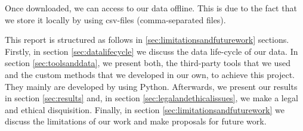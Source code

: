 Once downloaded, we can access to our data offline. This is due to the fact that we store it locally by using csv-files (comma-separated files).

This report is structured as follows in \ref{sec:limitationsandfuturework} sections. Firstly, in section \ref{sec:datalifecycle} we discuss the data life-cycle of our data. In section  \ref{sec:toolsanddata}, we present both, the third-party tools that we used and the custom methods that we developed in our own, to achieve this project. They mainly are developed by using Python.  Afterwards, we present our results in section \ref{sec:results} and, in section \ref{sec:legalandethicalissues}, we make a legal and ethical disquisition. Finally, in section \ref{sec:limitationsandfuturework} we discuss the limitations of our work and make proposals for future work.